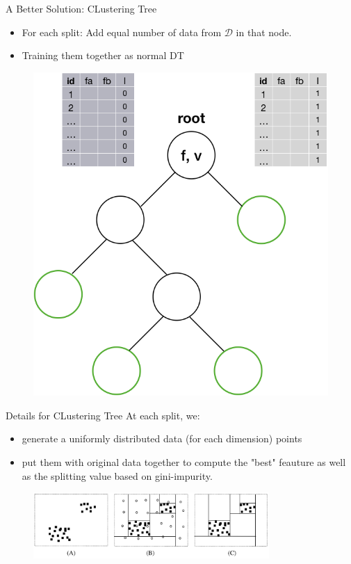 \documentclass[shortpres]{beamer}
\begin{document}
  \begin{frame}{A Better Solution: CLustering Tree}	
    \begin{itemize} 
      \item For each split: Add equal number of data from $\mathcal{D}$ in that node.
      \item Training them together as normal DT
    \end{itemize}
    \begin{figure}
      \includegraphics[height=0.6\textheight]{fig/dtwithout3.png} 
    \end{figure}
    \end{frame}
  \begin{frame}{Details for CLustering Tree}	
    At each split, we:
    \begin{itemize} 
      \item generate a uniformly distributed data (for each dimension) points
      \item put them with original data together to compute the "best" feauture as well as the splitting value based on gini-impurity.
    \end{itemize}   
    \begin{figure}
      \includegraphics[width=0.8\textwidth]{fig/random_noise_clustering.png}
    \end{figure}
  \end{frame}
\end{document}
